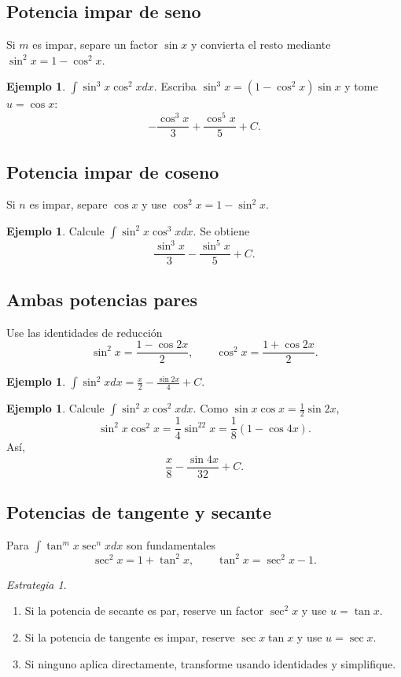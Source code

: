 \documentclass[12pt]{article}
\theoremstyle{definition}
\newtheorem{ejemplo}[teorema]{Ejemplo}
\theoremstyle{remark}
\newtheorem*{estrategia}{Estrategia}
\begin{document}
\subsection*{Potencia impar de seno}
Si $m$ es impar, separe un factor $\sin x$ y convierta el resto mediante $\sin^2x=1-\cos^2x$.

\begin{ejemplo}$\int\sin^3x\cos^2x dx$. Escriba $\sin^3x=(1-\cos^2x)\sin x$ y tome $u=\cos x$:
\[\boxed{-\frac{\cos^3x}{3}+\frac{\cos^5x}{5}+C}.\]\end{ejemplo}

\subsection*{Potencia impar de coseno}
Si $n$ es impar, separe $\cos x$ y use $\cos^2x=1-\sin^2x$.
\begin{ejemplo}Calcule $\int\sin^2x\cos^3x dx$. Se obtiene\[\boxed{\frac{\sin^3x}{3}-\frac{\sin^5x}{5}+C}.\]\end{ejemplo}
\subsection*{Ambas potencias pares}
Use las identidades de reducción
\[\sin^2x=\frac{1-\cos2x}{2},\qquad\cos^2x=\frac{1+\cos2x}{2}.\]
\begin{ejemplo}$\int\sin^2x dx=\boxed{\frac{x}{2}-\frac{\sin2x}{4}+C}$.\end{ejemplo}

\begin{ejemplo}Calcule $\int\sin^2x\cos^2x dx$. Como $\sin x\cos x=\frac12\sin2x$,
\[\sin^2x\cos^2x=\frac14\sin^22x=\frac18(1-\cos4x).\]
Así,
\[\boxed{\frac{x}{8}-\frac{\sin4x}{32}+C}.\]\end{ejemplo}
\subsection*{Potencias de tangente y secante}
Para $\int\tan^m x\sec^n xdx$ son fundamentales
\[\sec^2x=1+\tan^2x,\qquad \tan^2x=\sec^2x-1.\]
\begin{estrategia}
\begin{enumerate}
\item Si la potencia de secante es par, reserve un factor $\sec^2x$ y use $u=\tan x$.
\item Si la potencia de tangente es impar, reserve $\sec x\tan x$ y use $u=\sec x$.
\item Si ninguno aplica directamente, transforme usando identidades y simplifique.
\end{enumerate}
\end{estrategia}
\end{document}
